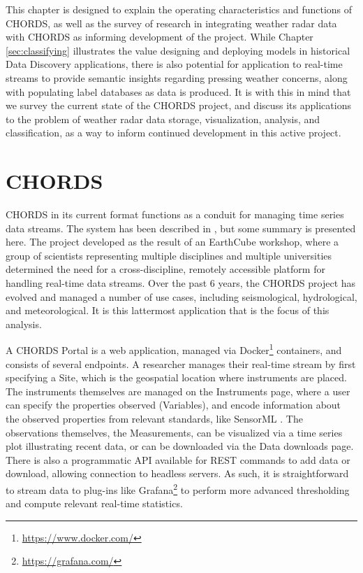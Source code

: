 This chapter is designed to explain the operating characteristics and functions of CHORDS, as well as the survey of research in integrating weather radar data with CHORDS as informing development of the project.
While Chapter \ref{sec:classifying} illustrates the value designing and deploying models in historical Data Discovery applications, there is also potential for application to real-time streams to provide semantic insights regarding pressing weather concerns, along with populating label databases as data is produced.
It is with this in mind that we survey the current state of the CHORDS project, and discuss its applications to the problem of weather radar data storage, visualization, analysis, and classification, as a way to inform continued development in this active project.

\section{CHORDS}
\label{sec:realtime_chords}
CHORDS in its current format functions as a conduit for managing time series data streams.
The system has been described in \cite{kerkez2016cloud}, but some summary is presented here.
The project developed as the result of an EarthCube workshop, where a group of scientists representing multiple disciplines and multiple universities determined the need for a cross-discipline, remotely accessible platform for handling real-time data streams.
Over the past 6 years, the CHORDS project has evolved and managed a number of use cases, including seismological\cite{jones2017implementing}, hydrological\cite{wong2016real}, and meteorological.
It is this lattermost application that is the focus of this analysis.

A CHORDS Portal is a web application, managed via Docker\footnote{\url{https://www.docker.com/}} containers, and consists of several endpoints.
A researcher manages their real-time stream by first specifying a Site, which is the geospatial location where instruments are placed. 
The instruments themselves are managed on the Instruments page, where a user can specify the properties observed (Variables), and encode information about the observed properties from relevant standards, like SensorML \cite{van2009using}.
The observations themselves, the Measurements, can be visualized via a time series plot illustrating recent data, or can be downloaded via the Data downloads page.
There is also a programmatic API available for REST commands to add data or download, allowing connection to headless servers.
As such, it is straightforward to stream data to plug-ins like Grafana\footnote{\url{https://grafana.com/}} to perform more advanced thresholding and compute relevant real-time statistics.

